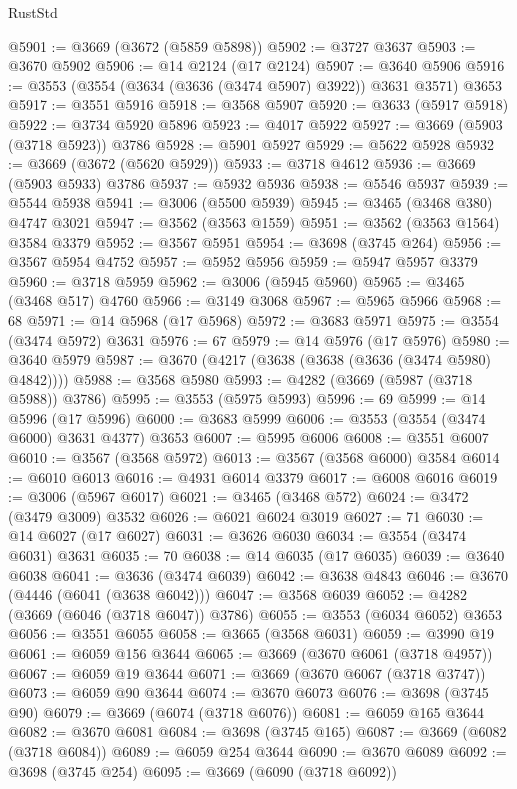\begin{lexlean}{RustStd}
\begin{coremodule}
@5901 := @3669 (@3672 (@5859 @5898))
@5902 := @3727 @3637
@5903 := @3670 @5902
@5906 := @14 @2124 (@17 @2124)
@5907 := @3640 @5906
@5916 := @3553 (@3554 (@3634 (@3636 (@3474 @5907) @3922)) @3631 @3571) @3653
@5917 := @3551 @5916
@5918 := @3568 @5907
@5920 := @3633 (@5917 @5918)
@5922 := @3734 @5920 @5896
@5923 := @4017 @5922
@5927 := @3669 (@5903 (@3718 @5923)) @3786
@5928 := @5901 @5927
@5929 := @5622 @5928
@5932 := @3669 (@3672 (@5620 @5929))
@5933 := @3718 @4612
@5936 := @3669 (@5903 @5933) @3786
@5937 := @5932 @5936
@5938 := @5546 @5937
@5939 := @5544 @5938
@5941 := @3006 (@5500 @5939)
@5945 := @3465 (@3468 @380) @4747 @3021
@5947 := @3562 (@3563 @1559)
@5951 := @3562 (@3563 @1564) @3584 @3379
@5952 := @3567 @5951
@5954 := @3698 (@3745 @264)
@5956 := @3567 @5954 @4752
@5957 := @5952 @5956
@5959 := @5947 @5957 @3379
@5960 := @3718 @5959
@5962 := @3006 (@5945 @5960)
@5965 := @3465 (@3468 @517) @4760
@5966 := @3149 @3068
@5967 := @5965 @5966
@5968 := 68
@5971 := @14 @5968 (@17 @5968)
@5972 := @3683 @5971
@5975 := @3554 (@3474 @5972) @3631
@5976 := 67
@5979 := @14 @5976 (@17 @5976)
@5980 := @3640 @5979
@5987 := @3670 (@4217 (@3638 (@3638 (@3636 (@3474 @5980) @4842))))
@5988 := @3568 @5980
@5993 := @4282 (@3669 (@5987 (@3718 @5988)) @3786)
@5995 := @3553 (@5975 @5993)
@5996 := 69
@5999 := @14 @5996 (@17 @5996)
@6000 := @3683 @5999
@6006 := @3553 (@3554 (@3474 @6000) @3631 @4377) @3653
@6007 := @5995 @6006
@6008 := @3551 @6007
@6010 := @3567 (@3568 @5972)
@6013 := @3567 (@3568 @6000) @3584
@6014 := @6010 @6013
@6016 := @4931 @6014 @3379
@6017 := @6008 @6016
@6019 := @3006 (@5967 @6017)
@6021 := @3465 (@3468 @572)
@6024 := @3472 (@3479 @3009) @3532
@6026 := @6021 @6024 @3019
@6027 := 71
@6030 := @14 @6027 (@17 @6027)
@6031 := @3626 @6030
@6034 := @3554 (@3474 @6031) @3631
@6035 := 70
@6038 := @14 @6035 (@17 @6035)
@6039 := @3640 @6038
@6041 := @3636 (@3474 @6039)
@6042 := @3638 @4843
@6046 := @3670 (@4446 (@6041 (@3638 @6042)))
@6047 := @3568 @6039
@6052 := @4282 (@3669 (@6046 (@3718 @6047)) @3786)
@6055 := @3553 (@6034 @6052) @3653
@6056 := @3551 @6055
@6058 := @3665 (@3568 @6031)
@6059 := @3990 @19
@6061 := @6059 @156 @3644
@6065 := @3669 (@3670 @6061 (@3718 @4957))
@6067 := @6059 @19 @3644
@6071 := @3669 (@3670 @6067 (@3718 @3747))
@6073 := @6059 @90 @3644
@6074 := @3670 @6073
@6076 := @3698 (@3745 @90)
@6079 := @3669 (@6074 (@3718 @6076))
@6081 := @6059 @165 @3644
@6082 := @3670 @6081
@6084 := @3698 (@3745 @165)
@6087 := @3669 (@6082 (@3718 @6084))
@6089 := @6059 @254 @3644
@6090 := @3670 @6089
@6092 := @3698 (@3745 @254)
@6095 := @3669 (@6090 (@3718 @6092))

\end{coremodule}
\end{lexlean}
